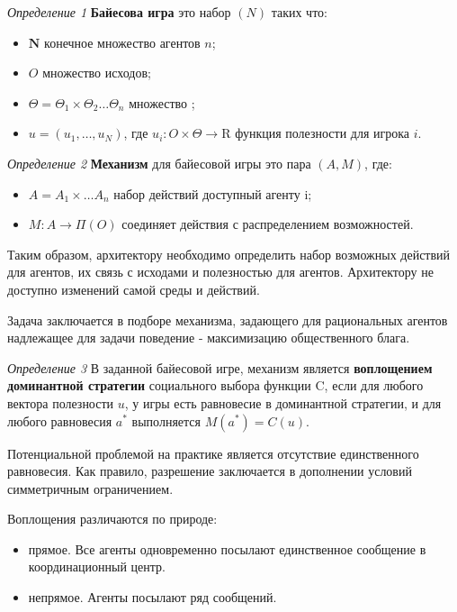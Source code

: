 

\textit{Определение 1} \textbf{Байесова игра} это набор $(N)$ таких что:

\begin{itemize}
    \item $\mathbf{N}$ конечное множество агентов $n$;
    \item $O$ множество исходов;
    \item $\Theta = \Theta_1 \times \Theta_2 \dots \Theta_n $ множество ;
    \item $u = (u_1, \dots, u_N)$, где $u_i: O \times \Theta \rightarrow \mathrm{R}$  функция полезности для игрока $i$.
\end{itemize}






\textit{Определение 2} \textbf{Механизм} для байесовой игры это пара $(A,M)$, где:
\begin{itemize}
    \item $A = A_1 \times \dots A_n$ набор действий доступный агенту i;
    \item $M: A \rightarrow \Pi(O)$ соединяет действия с распределением возможностей.
\end{itemize}


Таким образом, архитектору необходимо определить набор возможных действий для агентов,  их связь с исходами и полезностью для агентов. Архитектору не доступно изменений самой среды и действий.


Задача заключается в подборе механизма, задающего для рациональных агентов надлежащее для задачи поведение - максимизацию общественного блага.

\textit{Определение 3} В заданной байесовой игре, механизм является \textbf{воплощением доминантной стратегии} социального выбора функции C, если для любого вектора полезности $u$, у игры есть равновесие в доминантной стратегии, и для любого равновесия $a^*$ выполняется $M(a^*) = C(u)$.

Потенциальной проблемой на практике является отсутствие единственного равновесия. Как правило, разрешение заключается в дополнении условий симметричным ограничением.\cite{milgrom1982theory}

Воплощения различаются по природе:
\begin{itemize}
\item прямое. Все агенты одновременно посылают единственное сообщение в координационный центр.
\item непрямое. Агенты посылают ряд сообщений.
\end{itemize}


